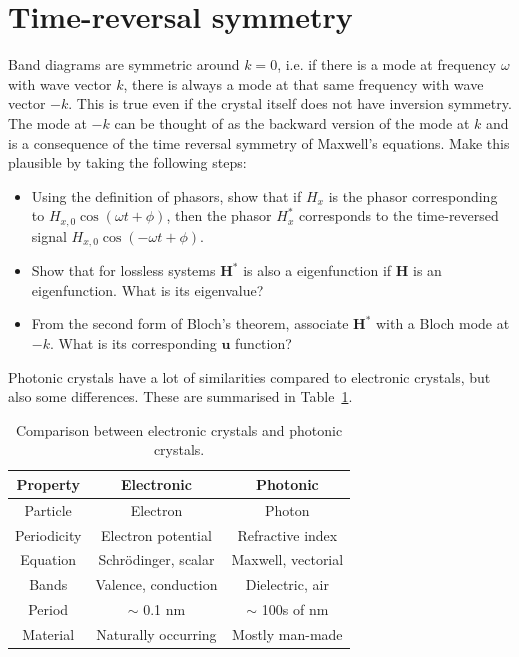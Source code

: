  
\pagebreak

\section{Time-reversal symmetry}

\begin{exer}
Band diagrams are symmetric around $k=0$, i.e. if there is a mode at frequency $\omega$ with wave vector $k$, there is always a mode at that same frequency with wave vector $-k$. This is true even if the crystal itself does not have inversion symmetry. The mode at $-k$ can be thought of as the backward version of the mode at $k$ and is a consequence of the time reversal symmetry of Maxwell's equations. Make this plausible by taking the following steps:
\begin{itemize}
\item Using the definition of phasors, show that if $H_x$ is the phasor corresponding to $ H_{x,0} \cos \left( \omega t + \phi \right)$, then the phasor $H^*_x$ corresponds to the time-reversed signal $ H_{x,0} \cos \left(- \omega t + \phi  \right)$.
\item Show that for lossless systems ${\mathbf H}^*$ is also a eigenfunction if ${\mathbf H}$ is an eigenfunction. What is its eigenvalue?
\item From the second form of Bloch's theorem, associate ${\mathbf H}^*$ with a Bloch mode at $-k$. What is its corresponding ${\mathbf u}$ function?
\end{itemize}

\end{exer}

\pagebreak

\label{week10}

Photonic crystals have a lot of similarities compared to electronic crystals, but also some differences. These are summarised in Table~\ref{tab-phot-cryst}.

\begin{table}[h!]
  \begin{center}
    \begin{tabular}{c|c|c} 
      \textbf{Property} & \textbf{Electronic} & \textbf{Photonic}\\
      \hline
      Particle & Electron & Photon \\
      Periodicity & Electron potential & Refractive index \\
      Equation & Schr\"{o}dinger, scalar & Maxwell, vectorial \\
      Bands & Valence, conduction & Dielectric, air \\
      Period & $\sim$ 0.1 nm & $\sim$ 100s of nm \\
      Material & Naturally occurring & Mostly man-made \\
    \end{tabular}
  \end{center}
  \caption{Comparison between electronic crystals and photonic crystals.}
  \label{tab-phot-cryst}
\end{table}


